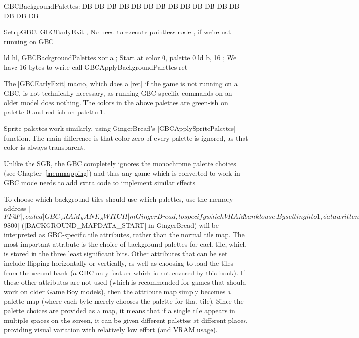 \documentclass[11pt]{book}
\begin{document}
\begin{code}
GBCBackgroundPalettes:
DB %
DB %
DB %
DB %
DB %
DB %
DB %
DB %
DB %
DB %
DB %
DB %
DB %
DB %
DB %
DB %

SetupGBC:
    GBCEarlyExit ; No need to execute pointless code
    ; if we're not running on GBC
    
    ld hl, GBCBackgroundPalettes
    xor a ; Start at color 0, palette 0
    ld b, 16 ; We have 16 bytes to write
    call GBCApplyBackgroundPalettes
    ret
\end{code}

The |GBCEarlyExit| macro, which does a |ret| if the game is not running on a GBC, is not technically necessary, as running GBC-specific commands on an older model does nothing. The colors in the above palettes are green-ish on palette 0 and red-ish on palette 1.

Sprite palettes work similarly, using GingerBread's |GBCApplySpritePalettes| function. The main difference is that color zero of every palette is ignored, as that color is always transparent.

Unlike the SGB, the GBC completely ignores the monochrome palette choices (see Chapter~\ref{memmapping}) and thus any game which is converted to work in GBC mode needs to add extra code to implement similar effects.

To choose which background tiles should use which palettes, use the memory address |$FF4F|, called |GBC_VRAM_BANK_SWITCH| in GingerBread, to specify which VRAM bank to use. By setting it to 1, data written to the memory region starting at |$9800| (|BACKGROUND_MAPDATA_START| in GingerBread) will be interpreted as GBC-specific tile attributes, rather than the normal tile map. The most important attribute is the choice of background palettes for each tile, which is stored in the three least significant bits. Other attributes that can be set include flipping horizontally or vertically, as well as choosing to load the tiles from the second bank (a GBC-only feature which is not covered by this book). If these other attributes are not used (which is recommended for games that should work on older Game Boy models), then the attribute map simply becomes a palette map (where each byte merely chooses the palette for that tile). Since the palette choices are provided as a map, it means that if a single tile appears in multiple spaces on the screen, it can be given different palettes at different places, providing visual variation with relatively low effort (and VRAM usage). 
\end{document}
